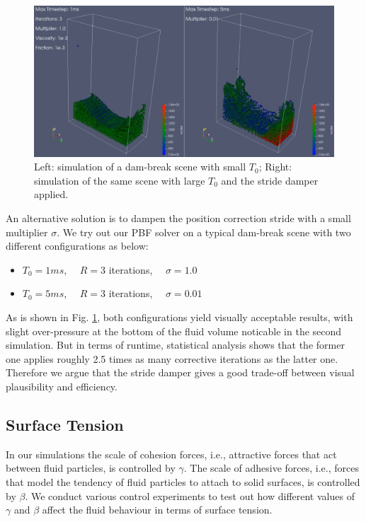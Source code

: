 \documentclass[
	11pt, 
	DIV10,
	ngerman,
	a4paper, 
	oneside, 
	headings=normal, 
	captions=tableheading,
	final, 
	numbers=noenddot
]{scrartcl}
\begin{document}
\begin{figure}
    \centering
    \includegraphics[width=.6\textwidth]{pics/pbf_stride_damper.png}
    \caption{Left: simulation of a dam-break scene with small $ T_{0} $; Right: simulation of the same scene with large $ T_{0} $ and the stride damper applied.}
    \label{fig:strideDamper}
\end{figure}

An alternative solution is to dampen the position correction stride with a small multiplier $ \sigma $. We try out our PBF solver on a typical dam-break scene with two different configurations as below:

\begin{itemize}
    \item $ T_{0} = 1ms $, $ \quad R = 3 $ iterations, $ \quad \sigma = 1.0 $
    \item $ T_{0} = 5ms $, $ \quad R = 3 $ iterations, $ \quad \sigma = 0.01 $
\end{itemize}

As is shown in Fig. \ref{fig:strideDamper}, both configurations yield visually acceptable results, with slight over-pressure at the bottom of the fluid volume noticable in the second simulation. But in terms of runtime, statistical analysis shows that the former one applies roughly 2.5 times as many corrective iterations as the latter one. Therefore we argue that the stride damper gives a good trade-off between visual plausibility and efficiency.

\subsection{Surface Tension}

In our simulations the scale of cohesion forces, i.e., attractive forces that act between fluid particles, is controlled by $ \gamma $. The scale of adhesive forces, i.e., forces that model the tendency of fluid particles to attach to solid surfaces, is controlled by $ \beta $. We conduct various control experiments to test out how different values of $ \gamma $ and $ \beta $ affect the fluid behaviour in terms of surface tension.
\end{document}

